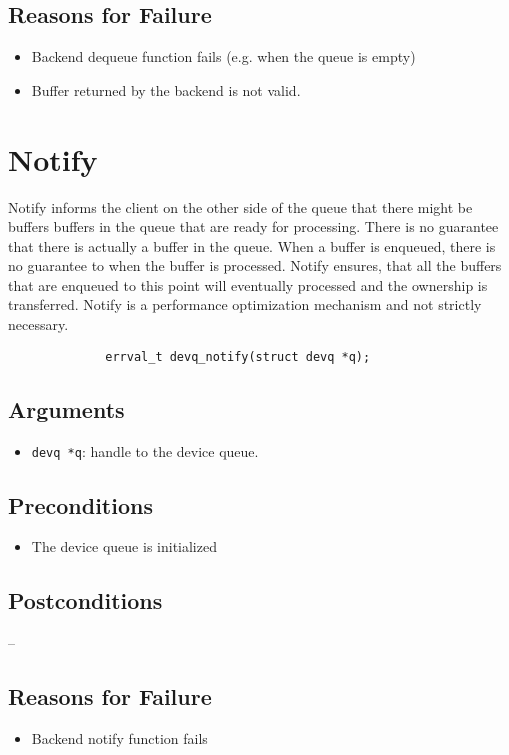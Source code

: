 \documentclass[a4paper,11pt,twoside]{report}
\begin{document}
	\subsection*{Reasons for Failure}
	\begin{itemize}
		\item Backend dequeue function fails (e.g. when the queue is empty)
		\item Buffer returned by the backend is not valid.
	\end{itemize}
	
	\section{Notify}
	Notify informs the client on the other side of the queue that there might be buffers 
	buffers in the queue that are ready for processing. There is no guarantee that there is 
	actually a buffer in the queue. When a buffer is enqueued, there
	is no guarantee to when the buffer is processed. Notify ensures, that
	all the buffers that are enqueued to this point will eventually processed and the ownership
	is transferred. Notify is a performance optimization mechanism and not strictly necessary.
	
	\begin{figure}[h]
		\begin{lstlisting}
		errval_t devq_notify(struct devq *q);
		\end{lstlisting}
		\label{lst:notify}
	\end{figure}
	
	\subsection*{Arguments}
	\begin{itemize}
		\item \texttt{devq *q}: handle to the device queue.
	\end{itemize}
	\subsection*{Preconditions}
	\begin{itemize}
		\item The device queue is initialized
	\end{itemize}
	\subsection*{Postconditions}
	-- 
	\subsection*{Reasons for Failure}
	\begin{itemize}
		\item Backend notify function fails
	\end{itemize} 
	
\end{document}
